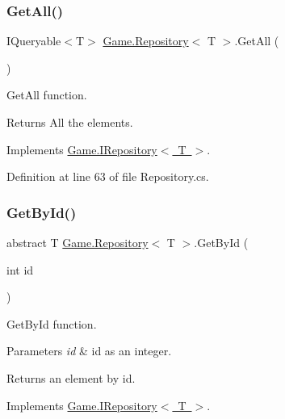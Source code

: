 \subsubsection{\texorpdfstring{GetAll()}{GetAll()}}
{\footnotesize\ttfamily I\+Queryable$<$T$>$ \mbox{\hyperlink{class_game_1_1_repository}{Game.\+Repository}}$<$ T $>$.Get\+All (\begin{DoxyParamCaption}{ }\end{DoxyParamCaption})}



Get\+All function. 

\begin{DoxyReturn}{Returns}
All the elements.
\end{DoxyReturn}


Implements \mbox{\hyperlink{interface_game_1_1_i_repository_a92cb62ff8c11bfb4a4effc1c7fec7954}{Game.\+I\+Repository$<$ T $>$}}.



Definition at line 63 of file Repository.\+cs.

\mbox{\label{class_game_1_1_repository_aa59d0df964f75cb36b0cf39e55bdb626}} 
\subsubsection{\texorpdfstring{GetById()}{GetById()}}
{\footnotesize\ttfamily abstract T \mbox{\hyperlink{class_game_1_1_repository}{Game.\+Repository}}$<$ T $>$.Get\+By\+Id (\begin{DoxyParamCaption}\item[{int}]{id }\end{DoxyParamCaption})\hspace{0.3cm}{\ttfamily [pure virtual]}}



Get\+By\+Id function. 


\begin{DoxyParams}{Parameters}
{\em id} & id as an integer.\\
\hline
\end{DoxyParams}
\begin{DoxyReturn}{Returns}
an element by id.
\end{DoxyReturn}


Implements \mbox{\hyperlink{interface_game_1_1_i_repository_a83cea424c282f311a64d650dc3adfcc5}{Game.\+I\+Repository$<$ T $>$}}.



